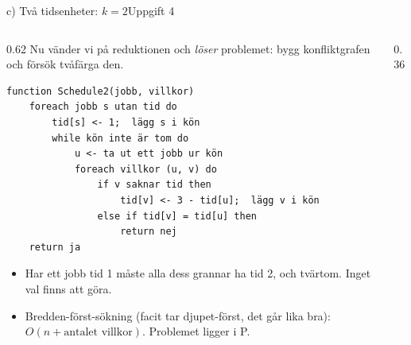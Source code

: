 \documentclass[aspectratio=169,10pt]{beamer}
\begin{document}
\begin{frame}[fragile]{c) Två tidsenheter: $k=2$}{Uppgift 4}
  \begin{columns}[T]
    \begin{column}{0.62\textwidth}
      Nu vänder vi på reduktionen och \emph{löser} problemet: bygg konfliktgrafen och försök tvåfärga den.
\begin{lstlisting}
function Schedule2(jobb, villkor)
    foreach jobb s utan tid do
        tid[s] <- 1;  lägg s i kön
        while kön inte är tom do
            u <- ta ut ett jobb ur kön
            foreach villkor (u, v) do
                if v saknar tid then
                    tid[v] <- 3 - tid[u];  lägg v i kön
                else if tid[v] = tid[u] then
                    return nej
    return ja
\end{lstlisting}
      \begin{itemize}
        \item<2-> Har ett jobb tid 1 måste alla dess grannar ha tid 2, och tvärtom. Inget val finns att göra.
        \item<3-> Bredden-först-sökning (facit tar djupet-först, det går lika bra): $O(n+\text{antalet villkor})$. Problemet ligger i P.
      \end{itemize}
    \end{column}
    \begin{column}{0.36\textwidth}
      \centering
    \end{column}
  \end{columns}
\end{frame}
\end{document}
